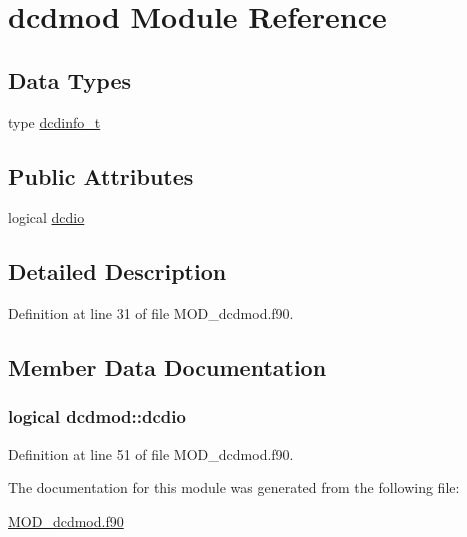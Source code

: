 \hypertarget{classdcdmod}{\section{dcdmod Module Reference}
\label{classdcdmod}
}
\subsection*{Data Types}
\begin{DoxyCompactItemize}
\item 
type \hyperlink{structdcdmod_1_1dcdinfo__t}{dcdinfo\-\_\-t}
\end{DoxyCompactItemize}
\subsection*{Public Attributes}
\begin{DoxyCompactItemize}
\item 
logical \hyperlink{classdcdmod_ad0f6ebae05a9d29d05d153588cf2c5b4}{dcdio}
\end{DoxyCompactItemize}


\subsection{Detailed Description}


Definition at line 31 of file M\-O\-D\-\_\-dcdmod.\-f90.



\subsection{Member Data Documentation}
\hypertarget{classdcdmod_ad0f6ebae05a9d29d05d153588cf2c5b4}{
\subsubsection[{dcdio}]{\setlength{\rightskip}{0pt plus 5cm}logical dcdmod\-::dcdio}}\label{classdcdmod_ad0f6ebae05a9d29d05d153588cf2c5b4}


Definition at line 51 of file M\-O\-D\-\_\-dcdmod.\-f90.



The documentation for this module was generated from the following file\-:\begin{DoxyCompactItemize}
\item 
\hyperlink{MOD__dcdmod_8f90}{M\-O\-D\-\_\-dcdmod.\-f90}\end{DoxyCompactItemize}
